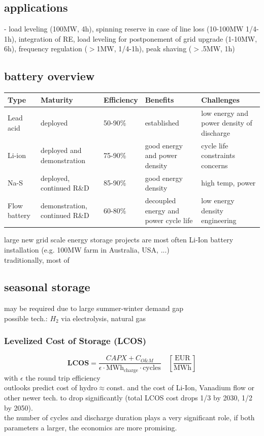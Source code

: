 \documentclass[a4paper,10pt,landscape]{scrartcl}
\begin{document}
\begin{multicols*}{3}
\subsection{applications}
- load leveling (100MW, 4h), spinning reserve in case of line loss (10-100MW 1/4-1h), integration of RE, load leveling for postponement of grid upgrade (1-10MW, 6h), frequency regulation ($>$1MW, 1/4-1h), peak shaving ($>$.5MW, 1h)
\subsection{battery overview}
\small %
\begin{tabular}{|p{1cm}|p{1.5cm}|p{1.5cm}|p{1.5cm}|p{1.75cm}|}
\hline
\textbf{Type} & \textbf{Maturity} & \textbf{Efficiency} & \textbf{Benefits} & \textbf{Challenges} \\ \hline
Lead acid & deployed & 50-90\% &established &low energy and power density of discharge \\ \hline
Li-ion & deployed and demonstration & 75-90\% &good energy and power density &cycle life constraints  concerns \\ \hline
Na-S & deployed, continued R\&D & 85-90\% &good energy density &high temp, power \\ \hline
Flow battery & demonstration, continued R\&D & 60-80\% &decoupled energy and power cycle life &low energy density engineering \\ \hline
\end{tabular}
large new grid scale energy storage projects are most often Li-Ion battery installation (e.g. 100MW farm in Australia, USA, ...) \\
traditionally, most of

\subsection{seasonal storage}
may be required due to large summer-winter demand gap \\
possible tech.: $H_2$ via electrolysis, natural gas

\subsubsection{Levelized Cost of Storage (LCOS)}
$$\mathbf{LCOS}=\frac{CAPX + C_{O\&M}}{\epsilon\cdot \text{MWh}_{\text{charge}}\cdot\text{cycles}} \quad \mathrm{\left[\frac{EUR}{MWh}\right]}$$
with $\epsilon$ the round trip efficiency \\
outlooks predict cost of hydro$\approx$const. and the cost of Li-Ion, Vanadium flow or other newer tech. to drop significantly (total LCOS cost drops 1/3 by 2030, 1/2 by 2050). \\
the number of cycles and discharge duration plays a very significant role, if both parameters a larger, the economics are more promising.


\end{multicols*}
\end{document}
